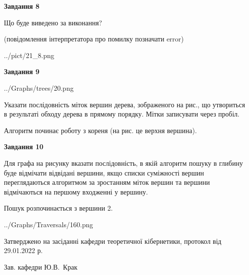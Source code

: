 \documentclass[12pt, ukrainian]{article}
\begin{document}
{\begin {large}
{\begin {center}\textbf{Завдання 8}\end {center}}\par
Що буде виведено за виконання?\par
 (повідомлення інтерпретатора про помилку позначати error)\par
\begin{center}
	{../pict/21_8.png}
\end{center}
\newpage

{\begin {center}\textbf{Завдання 9}\end {center}}\par

\begin{center}
	{../Graphs/trees/20.png}
\end{center}
Указати послідовність міток вершин дерева, зображеного на рис., що утвориться в результаті обходу дерева в прямому порядку. Мітки записувати через пробіл.\par Алгоритм починає роботу з кореня (на рис. це верхня вершина).\par
\newpage

{\begin {center}\textbf{Завдання 10}\end {center}}\par
Для графа на рисунку вказати послідовність, в якій алгоритм пошуку в глибину буде відмічати відвідані вершини, якщо списки суміжності вершин переглядаються алгоритмом за зростанням міток вершин та вершини відмічаються на першому вход\-женні у вершину.\par
Пошук розпочинається з вершини 2.\par

\begin{center}
	{../Graphs/Traversals/160.png}
\end{center}\par
\newpage


\end {large}
}
{\smallskip \begin {small} Затверджено на засіданні кафедри теоретичної кібернетики, протокол  від   29.01.2022 р.\par\smallskip\smallskip
{\parbox {6.5 cm}{Зав. кафедри \dotfill Ю.В.~Крак}} \end{small}}
\end{document}
